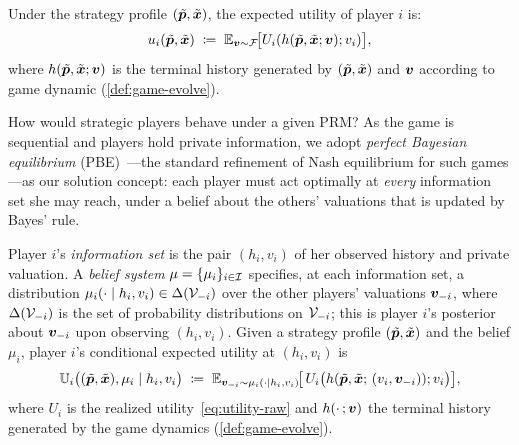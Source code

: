 Under the strategy profile $(\tilde{{\bm{p}}}, \tilde{{\bm{x}}})$, the expected utility of player $i$ is:
\begin{equation}
\label{eq:expected-utility}
u_i(\tilde{{\bm{p}}}, \tilde{{\bm{x}}}) \;\coloneqq\; \mathbb{E}_{{\bm{v}} \sim \mathcal{F}}\!\big[U_i(h(\tilde{{\bm{p}}}, \tilde{{\bm{x}}}; {\bm{v}}); v_i)\big],
\end{equation}
where $h(\tilde{{\bm{p}}}, \tilde{{\bm{x}}}; {\bm{v}})$ is the terminal history generated by $(\tilde{{\bm{p}}}, \tilde{{\bm{x}}})$ and ${\bm{v}}$ according to game dynamic (\cref{def:game-evolve}).

How would strategic players behave under a given PRM? As the game is sequential and players hold private information, we adopt \emph{perfect Bayesian equilibrium} (PBE)~\citep{fudenberg1991game,MWG}---the standard refinement of Nash equilibrium for such games---as our solution concept: each player must act optimally at \emph{every} information set she may reach, under a belief about the others' valuations that is updated by Bayes' rule.

Player $i$'s \emph{information set} is the pair $(h_i, v_i)$ of her observed history and private valuation. A \emph{belief system} $\mu = \{\mu_i\}_{i \in \mathcal{I}}$ specifies, at each information set, a distribution $\mu_i(\cdot \mid h_i, v_i) \in \Delta(\mathcal{V}_{-i})$ over the other players' valuations ${\bm{v}}_{-i}$, where $\Delta(\mathcal{V}_{-i})$ is the set of probability distributions on $\mathcal{V}_{-i}$; this is player $i$'s posterior about ${\bm{v}}_{-i}$ upon observing $(h_i, v_i)$. Given a strategy profile $(\tilde{{\bm{p}}}, \tilde{{\bm{x}}})$ and the belief $\mu_i$, player $i$'s conditional expected utility at $(h_i, v_i)$ is
\begin{equation}
\label{eq:cond-utility}
\mathbb{U}_i\big((\tilde{{\bm{p}}}, \tilde{{\bm{x}}}), \mu_i \mid h_i, v_i\big) \;\coloneqq\; \mathbb{E}_{{\bm{v}}_{-i} \sim \mu_i(\cdot \mid h_i, v_i)}\!\big[\, U_i\big(h(\tilde{{\bm{p}}}, \tilde{{\bm{x}}};\, (v_i, {\bm{v}}_{-i})); v_i\big)\big],
\end{equation}
where $U_i$ is the realized utility~\eqref{eq:utility-raw} and $h(\cdot\,; {\bm{v}})$ the terminal history generated by the game dynamics (\cref{def:game-evolve}).

